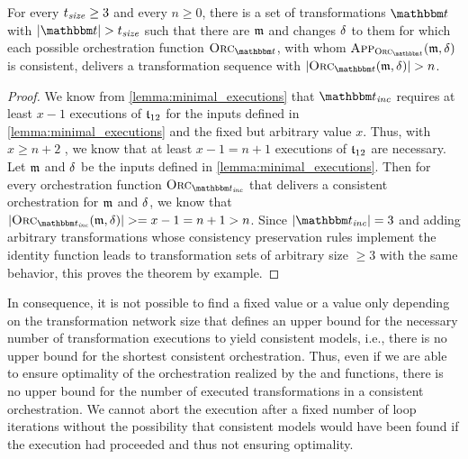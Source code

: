 \begin{theorem}
    \label{theorem:orchestration_fixed}
    For every $t_{\mathit{size}} \geq 3$ and every $n \geq 0$, there is a set of transformations $\transformationset{T}$ with $\abs{\transformationset{T}} > t_\mathvariable{size}$ such that there are $\modeltuple{m}$ and changes $\mathfrak{\delta}_{}$ to them for which each possible orchestration function $\orcfunction{\transformationset{T}}$, with whom $\appfunction{\orcfunction{\transformationset{T}}}(\modeltuple{m}, \changetuple{})$ is consistent, delivers a transformation sequence with $\abs{\orcfunction{\transformationset{T}}(\modeltuple{m}, \changetuple{})} > n$.
\end{theorem}
\begin{proof}
    We know from \autoref{lemma:minimal_executions} that $\transformationset{T}_\mathvariable{inc}$ requires at least $x-1$ executions of $\transformation{t}_{12}$ for the inputs defined in \autoref{lemma:minimal_executions} and the fixed but arbitrary value $x$.
    Thus, with $x \geq n+2$ %
    , we know that at least $x-1 = n+1$ executions of $\transformation{t}_{12}$ are necessary.
    Let $\modeltuple{m}$ and $\mathfrak{\delta}_{}$ be the inputs defined in \autoref{lemma:minimal_executions}.
    Then for every orchestration function $\orcfunction{\transformationset{T}_\mathvariable{inc}}$ that delivers a consistent orchestration for $\modeltuple{m}$ and $\mathfrak{\delta}_{}$, we know that $\abs{\orcfunction{\transformationset{T}_\mathvariable{inc}}(\modeltuple{m}, \changetuple{})} >= x-1 = n+1 > n$.
    Since $\abs{\transformationset{T}_\mathvariable{inc}} = 3$ and adding arbitrary transformations whose consistency preservation rules implement the identity function leads to transformation sets of arbitrary size $\geq 3$ with the same behavior, this proves the theorem by example.
\end{proof}

In consequence, it is not possible to find a fixed value or a value only depending on the transformation network size that defines an upper bound for the necessary number of transformation executions to yield consistent models, i.e., there is no upper bound for the shortest consistent orchestration.
Thus, even if we are able to ensure optimality of the orchestration realized by the  and  functions, there is no upper bound for the number of executed transformations in a consistent orchestration.
We cannot abort the execution after a fixed number of loop iterations without the possibility that consistent models would have been found if the execution had proceeded and thus not ensuring optimality.

